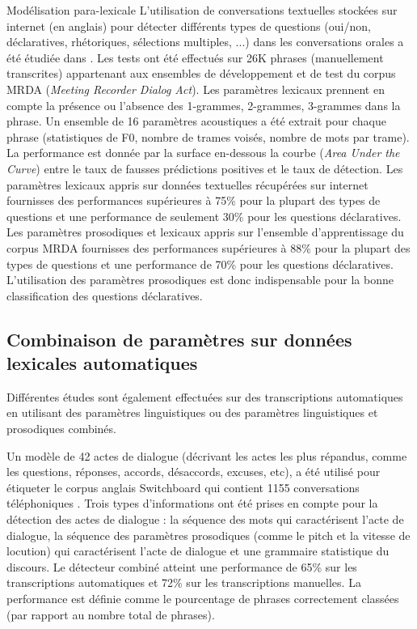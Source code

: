 \documentclass{style/these}
\let\oldcite=\cite
\renewcommand{\cite}[1]{{\fontfamily{qcs}\selectfont{\color{darkerblue}[\oldcite{#1}]}}}
\begin{document}
\begin{part}{Modélisation para-lexicale}
L'utilisation de conversations textuelles stockées sur internet (en anglais) pour détecter différents types de questions (oui/non, déclaratives, rhétoriques, sélections multiples, ...) dans les conversations orales a été étudiée dans \cite{Margolis:2011}. 
Les tests ont été effectués sur 26K phrases (manuellement transcrites) appartenant aux ensembles de développement et de test du corpus MRDA (\textit{Meeting Recorder Dialog Act}). 
Les paramètres lexicaux prennent en compte la présence ou l'absence des 1-grammes, 2-grammes, 3-grammes dans la phrase. 
Un ensemble de 16 paramètres acoustiques a été extrait pour chaque phrase (statistiques de F0, nombre de trames voisés, nombre de mots par trame). 
La performance est donnée par la surface en-dessous la courbe (\textit{Area Under the Curve}) entre le taux de fausses prédictions positives et le taux de détection.   
Les paramètres lexicaux appris sur données textuelles récupérées sur internet fournisses des performances supérieures à 75\% pour la plupart des types de questions et une performance de seulement 30\% pour les questions déclaratives.  
Les paramètres prosodiques et lexicaux appris sur l'ensemble d'apprentissage du corpus MRDA fournisses des performances supérieures à 88\% pour la plupart des types de questions et une performance de 70\% pour les questions déclaratives.  
L'utilisation des paramètres prosodiques est donc indispensable pour la bonne classification des questions déclaratives. 


\subsection*{Combinaison de paramètres sur données lexicales automatiques}
\renewcommand{\rightmark}{Combinaison de paramètres sur données automatiques}

Différentes études sont également effectuées sur des transcriptions automatiques en utilisant des paramètres linguistiques ou des paramètres linguistiques et prosodiques combinés.

Un modèle de 42 actes de dialogue (décrivant les actes les plus répandus, comme les questions, réponses, accords, désaccords, excuses, etc), a été utilisé pour étiqueter le corpus anglais Switchboard qui contient 1155 conversations téléphoniques \cite{Jurafsky:1997}. 
Trois types d'informations ont été prises en compte pour la détection des actes de dialogue : la séquence des mots qui caractérisent l'acte de dialogue, la séquence des paramètres prosodiques (comme le pitch et la vitesse de locution) qui caractérisent l'acte de dialogue et une grammaire statistique du discours. 
Le détecteur combiné atteint une performance de 65\% sur les transcriptions automatiques et 72\% sur les transcriptions manuelles. 
La performance est définie comme le pourcentage de phrases correctement classées (par rapport au nombre total de phrases). 


\end{part}
\end{document}
